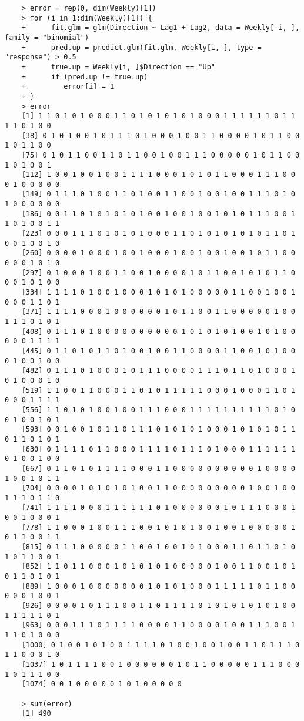 \documentclass{article}
\begin{document}
\begin{program}
	\begin{verbatim}
	> error = rep(0, dim(Weekly)[1]) 
	> for (i in 1:dim(Weekly)[1]) {
	+      fit.glm = glm(Direction ~ Lag1 + Lag2, data = Weekly[-i, ],  family = "binomial")
	+      pred.up = predict.glm(fit.glm, Weekly[i, ], type = "response") > 0.5 
	+      true.up = Weekly[i, ]$Direction == "Up"
	+      if (pred.up != true.up)
	+         error[i] = 1
	+ } 
	> error
	[1] 1 1 0 1 0 1 0 0 0 1 1 0 1 0 1 0 1 0 1 0 0 0 1 1 1 1 1 1 0 1 1 1 1 0 1 0 0
	[38] 0 1 0 1 0 0 1 0 1 1 1 0 1 0 0 0 1 0 0 1 1 0 0 0 0 1 0 1 1 0 0 1 0 1 1 0 0
	[75] 0 1 0 1 1 0 0 1 1 0 1 1 0 0 1 0 0 1 1 1 0 0 0 0 0 1 0 1 1 0 0 1 0 1 0 0 1
	[112] 1 0 0 1 0 0 1 0 0 1 1 1 1 0 0 0 1 0 1 0 1 1 0 0 0 1 1 1 0 0 0 1 0 0 0 0 0
	[149] 0 1 1 1 0 1 0 0 1 1 0 1 0 0 1 1 0 0 1 0 0 1 0 0 1 1 1 0 1 0 1 0 0 0 0 0 0
	[186] 0 0 1 1 0 1 0 1 0 1 0 1 0 0 1 0 0 1 0 0 1 0 1 0 1 1 1 0 0 1 1 0 1 0 0 1 1
	[223] 0 0 0 1 1 1 0 1 0 1 0 1 0 0 0 1 1 0 1 0 1 0 1 0 1 0 1 1 0 1 0 0 1 0 0 1 0
	[260] 0 0 0 0 1 0 0 0 1 0 0 1 0 0 0 1 0 0 1 0 0 1 0 0 1 0 1 1 0 0 0 0 0 1 0 1 0
	[297] 0 1 0 0 0 1 0 0 1 1 0 0 1 0 0 0 0 1 0 1 1 0 0 1 0 1 0 1 1 0 0 0 1 0 1 0 0
	[334] 1 1 1 1 0 1 0 0 1 0 0 0 1 0 1 0 1 0 0 0 0 0 1 1 0 0 1 0 0 1 0 0 0 1 1 0 1
	[371] 1 1 1 1 0 0 0 1 0 0 0 0 0 0 1 0 1 1 0 0 1 1 0 0 0 0 0 1 0 0 1 1 1 0 1 0 1
	[408] 0 1 1 1 0 1 0 0 0 0 0 0 0 0 0 0 1 0 1 0 1 0 1 0 0 1 0 1 0 0 0 0 0 1 1 1 1
	[445] 0 1 1 0 1 0 1 1 0 1 0 0 1 0 0 1 1 0 0 0 0 1 1 0 0 1 0 1 0 0 0 1 0 0 1 0 0
	[482] 0 1 1 1 0 1 0 0 0 1 0 1 1 1 0 0 0 0 1 1 1 0 1 1 0 1 0 0 0 1 0 1 0 0 0 1 0
	[519] 1 1 0 0 1 1 0 0 0 1 1 0 1 0 1 1 1 1 1 0 0 0 1 0 0 0 1 1 0 1 0 0 0 1 1 1 1
	[556] 1 1 0 1 0 1 0 0 1 0 0 1 1 1 0 0 0 1 1 1 1 1 1 1 1 1 1 0 1 0 0 1 0 0 1 0 1
	[593] 0 0 1 0 0 1 0 1 1 0 1 1 1 0 1 0 1 0 1 0 0 0 1 0 1 0 1 0 1 1 0 1 1 0 1 0 1
	[630] 0 1 1 1 1 0 1 1 0 0 0 1 1 1 1 0 1 1 1 0 1 0 0 0 1 1 1 1 1 1 0 1 0 0 1 0 0
	[667] 0 1 1 0 1 0 1 1 1 1 0 0 0 1 1 0 0 0 0 0 0 0 0 0 0 1 0 0 0 0 1 0 0 1 0 1 1
	[704] 0 0 0 0 1 0 1 0 1 0 1 0 0 1 1 0 0 0 0 0 0 0 0 0 1 0 0 1 0 0 1 1 1 0 1 1 0
	[741] 1 1 1 1 0 0 0 1 1 1 1 1 1 0 1 0 0 0 0 0 0 1 0 1 1 1 0 0 0 1 0 0 1 0 0 0 1
	[778] 1 1 0 0 0 1 0 0 1 1 1 0 0 1 0 1 0 1 0 0 1 0 0 1 0 0 0 0 0 1 0 1 1 0 0 1 1
	[815] 0 1 1 1 0 0 0 0 0 1 1 0 0 1 0 0 1 0 1 0 0 0 1 1 0 1 1 0 1 0 1 0 1 1 0 0 1
	[852] 1 1 0 1 1 0 0 0 1 0 1 0 1 0 1 0 0 0 0 0 1 0 0 1 1 0 0 1 0 1 0 1 1 0 1 0 1
	[889] 1 0 0 0 1 0 0 0 0 0 0 0 1 0 1 0 1 0 0 0 1 1 1 1 1 0 1 1 0 0 0 0 0 1 0 0 1
	[926] 0 0 0 0 1 0 1 1 1 0 0 1 1 0 1 1 1 1 0 1 0 1 0 1 0 1 0 1 0 0 1 1 1 1 1 0 1
	[963] 0 0 0 1 1 1 0 1 1 1 1 0 0 0 0 1 1 0 0 0 0 1 0 0 1 1 1 0 0 1 1 1 0 1 0 0 0
	[1000] 0 1 0 0 1 0 1 0 0 1 1 1 1 0 1 0 0 1 0 0 1 0 0 1 1 0 1 1 1 0 1 1 0 0 0 1 0
	[1037] 1 0 1 1 1 1 0 0 1 0 0 0 0 0 0 1 0 1 1 0 0 0 0 0 1 1 1 0 0 0 1 0 1 1 1 0 0
	[1074] 0 0 1 0 0 0 0 0 1 0 1 0 0 0 0 0
	
	> sum(error)
	[1] 490
	\end{verbatim}
\end{program}
\end{document}
